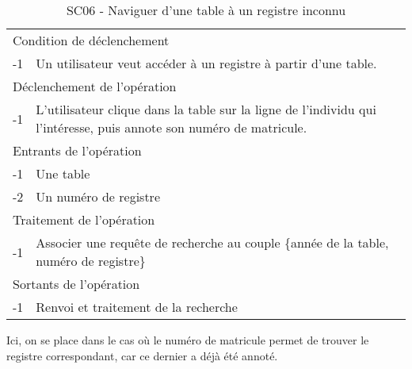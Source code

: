 \documentclass[a4paper]{article}
\begin{document}
\begin{table}[H]
  \centering
   \small
	\begin{tabular}{|c|p{12cm}|}
   		\hline
   			\rowcolor{lightgray}\multicolumn{2}{|c|}{\textbf{SC06 - Naviguer d'une table à un registre inconnu}} \\
   		\hline
   			\multicolumn{2}{|l|}{Condition de d\'eclenchement} \\
   		\hline
   		-1 & Un utilisateur veut acc\'eder \`a un registre à partir d'une table. \\
   		\hline
   			\multicolumn{2}{|l|}{D\'eclenchement de l'op\'eration} \\
   		\hline
   			-1 & L'utilisateur clique dans la table sur la ligne de l'individu qui l'intéresse, puis annote son numéro de matricule. \\
   		\hline
   			\multicolumn{2}{|l|}{Entrants de l'op\'eration} \\
   		\hline
   			-1 & Une table \\
        	-2 & Un numéro de registre \\ 
   		\hline
   			\multicolumn{2}{|l|}{Traitement de l'op\'eration} \\
  		\hline
   			-1 & Associer une requête de recherche au couple \{année de la table, numéro de registre\} \\
   		\hline
   			\multicolumn{2}{|l|}{Sortants de l'op\'eration} \\
   		\hline
   			-1 & Renvoi et traitement de la recherche \\
   		\hline
	\end{tabular}
  \caption{SC06 - Naviguer d'une table à un registre inconnu}
  \normalsize
  \label{tab:naviguer_table_registre_inconnu}
\end{table}
\newpage



Ici, on se place dans le cas où le numéro de matricule permet de trouver le registre correspondant, car ce dernier a déjà été annoté.
\end{document}
